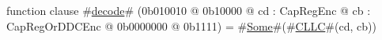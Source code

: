 function clause #\hyperref[sailMIPSzdecode]{decode}# (0b010010 @ 0b10000 @ cd : CapRegEnc @ cb : CapRegOrDDCEnc @ 0b0000000 @ 0b1111) = #\hyperref[sailMIPSzSome]{Some}#(#\hyperref[sailMIPSzCLLC]{CLLC}#(cd, cb))
